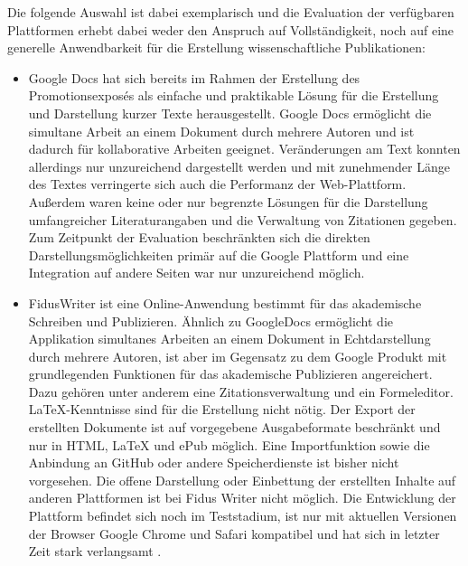 Die folgende Auswahl ist dabei exemplarisch und die Evaluation der verfügbaren Plattformen erhebt dabei weder den Anspruch auf Vollständigkeit, noch auf eine generelle Anwendbarkeit für die Erstellung wissenschaftliche Publikationen:
\begin{itemize}
\item Google Docs hat sich bereits im Rahmen der Erstellung des Promotionsexposés als einfache und praktikable Lösung für die Erstellung und Darstellung kurzer Texte herausgestellt. Google Docs ermöglicht die simultane Arbeit an einem Dokument durch mehrere Autoren und ist dadurch für kollaborative Arbeiten geeignet. Veränderungen am Text konnten allerdings nur unzureichend dargestellt werden und mit zunehmender Länge des Textes verringerte sich auch die Performanz der Web-Plattform. Außerdem waren keine oder nur begrenzte Lösungen für die Darstellung umfangreicher Literaturangaben und die Verwaltung von Zitationen gegeben. Zum Zeitpunkt der Evaluation beschränkten sich die direkten Darstellungsmöglichkeiten primär auf die Google Plattform und eine Integration auf andere Seiten war nur unzureichend möglich.
\item FidusWriter ist eine Online-Anwendung bestimmt für das akademische Schreiben und Publizieren. Ähnlich zu GoogleDocs ermöglicht die Applikation simultanes Arbeiten an einem Dokument in Echtdarstellung durch mehrere Autoren, ist aber im Gegensatz zu dem Google Produkt mit grundlegenden Funktionen für das akademische Publizieren angereichert. Dazu gehören unter anderem eine Zitationsverwaltung und ein Formeleditor. LaTeX-Kenntnisse sind für die Erstellung nicht nötig. Der Export der erstellten Dokumente ist auf vorgegebene Ausgabeformate beschränkt und nur in HTML, LaTeX und ePub möglich. Eine Importfunktion sowie die Anbindung an GitHub oder andere Speicherdienste ist bisher nicht vorgesehen. Die offene Darstellung oder Einbettung der erstellten Inhalte auf anderen Plattformen ist bei Fidus Writer nicht möglich. Die Entwicklung der Plattform befindet sich noch im Teststadium, ist nur mit aktuellen Versionen der Browser Google Chrome und Safari kompatibel und hat sich in letzter Zeit stark verlangsamt \cite{fidus_2015}.

\end{itemize}
